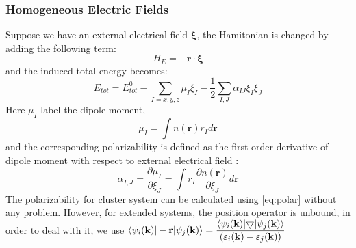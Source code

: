 \subsubsection{Homogeneous Electric Fields}
Suppose we have an external electrical field $\mathbf{\xi }$, the Hamitonian is changed by adding the following term:
\begin{equation}
H_{E}=- \mathbf{r} \cdot \mathbf{\xi}
\end{equation}
and the induced total energy becomes: 
\begin{equation}
E_{tot}=E^0_{tot} - \sum_{I=x,y,z}\mu_{I}\xi_{I}-
\dfrac{1}{2}\sum_{I,J}\alpha_{I J}\xi_{I}\xi_{J}
\end{equation}
Here $\mu_{I}$ label the dipole moment, 
\begin{equation}
\mu_{I}=\int{n(\mathbf{r}) r_I d\mathbf{r} }
\end{equation}
and the corresponding polarizability is defined as the first order derivative of dipole moment with respect to external electrical field :
\begin{equation}
\alpha_{I,J}= \dfrac{\partial \mu_{I}}{\partial \xi_{J}}= \int{ r_I \dfrac{\partial n(\mathbf{r})}{\partial \xi_{J} } d \mathbf{r}}
\label{eq:polar}
\end{equation}
The polarizability for cluster system can be calculated using \ref{eq:polar} without any problem. However, for extended systems, the position operator is 
unbound, in order to deal with it, we use 
$
\braket{\psi_{i}(\mathbf{k})|-\mathbf{r}|\psi_{j}(\mathbf{k})}=\dfrac{\braket{\psi_{i}(\mathbf{k})|\mathbf{\bigtriangledown}|\psi_{j}(\mathbf{k})}}{(\varepsilon_i(\mathbf{k})-\varepsilon_j(\mathbf{k}))}
$
